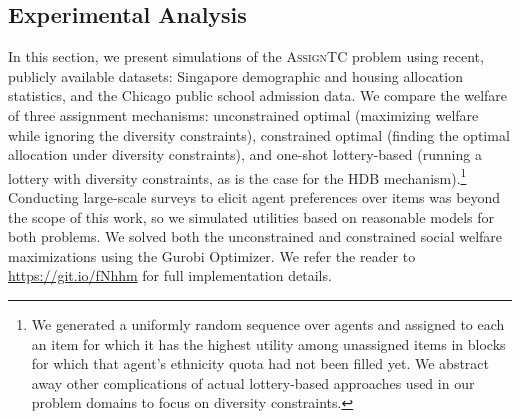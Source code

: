 \documentclass[11pt,dvipdfmx]{article}
\newcommand{\ASTC}{\textsc{AssignTC}\xspace}
\begin{document}
\subsection{Experimental Analysis}\label{sec:experiments}
In this section, we present simulations of the \ASTC problem using recent, publicly available datasets: Singapore demographic and housing allocation statistics, and the Chicago public school admission data. 
We compare the welfare of three assignment mechanisms: unconstrained optimal (maximizing welfare while ignoring the diversity constraints), constrained optimal (finding the optimal allocation under diversity constraints), and one-shot lottery-based (running a lottery with diversity constraints, as is the case for the HDB mechanism).\footnote{We generated a uniformly random sequence over agents and assigned to each an item for which it has the highest utility among unassigned items in blocks for which that agent's ethnicity quota had not been filled yet. We abstract away other complications of actual lottery-based approaches used in our problem domains to focus on diversity constraints.} Conducting large-scale surveys to elicit agent preferences over items was beyond the scope of this work, so we simulated utilities based on reasonable models for both problems. We solved both the unconstrained and constrained social welfare maximizations using the Gurobi Optimizer. We refer the reader to \url{https://git.io/fNhhm} for full implementation details. 
\end{document}
